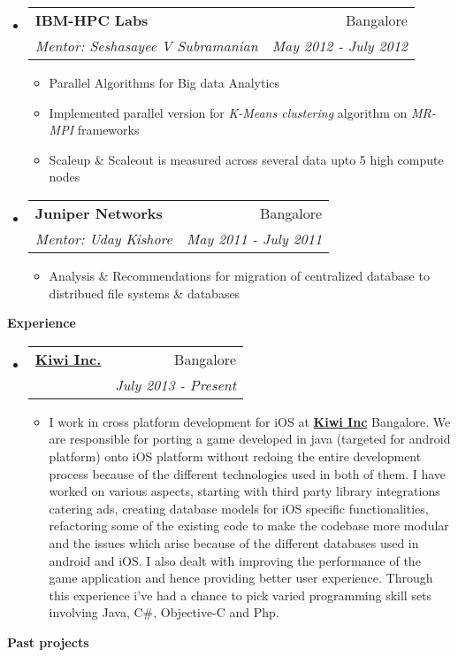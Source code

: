 \documentclass[letterpaper,11pt]{article}
\makeatletter
\newcommand{\resitem}[1]{\item #1 \vspace{-2pt}}
\newcommand{\resheading}[1]{{\large \colorbox{mygrey}{\begin{minipage}{\textwidth}{\textbf{#1 \vphantom{p\^{E}}}}\end{minipage}}}}
\newcommand{\ressubheading}[4]{
\begin{tabular*}{6.5in}{l@{\extracolsep{\fill}}r}
		\textbf{#1} & #2 \\
		\textit{#3} & \textit{#4} \\
\end{tabular*}\vspace{-6pt}}
\makeatother
\begin{document}
\begin{itemize}
		\item
			\ressubheading{{IBM-HPC Labs}}{Bangalore}{Mentor: Seshasayee V Subramanian}{May 2012 - July 2012}
				{\footnotesize
				\begin{itemize}
					\resitem{Parallel Algorithms for Big data Analytics}
					\resitem{Implemented parallel version for \emph{K-Means clustering} algorithm on \emph{MR-MPI} frameworks}
					\resitem{Scaleup \& Scaleout is measured across several data upto 5 high compute nodes}
				\end{itemize}
				}
		\item 
			\ressubheading{{Juniper Networks}}{Bangalore}{Mentor: Uday Kishore}{May 2011 - July 2011}
				{ \footnotesize
				\begin{itemize}
					\resitem{Analysis \& Recommendations for migration of centralized database to distribued file systems \& databases}
				\end{itemize}
				}

\end{itemize}
\resheading{Experience}
\begin{itemize}
	\item
		\ressubheading{{\href{http:http://www.kiwiup.com/}{Kiwi Inc.}}}{Bangalore}{}{July 2013 - Present}
		{\footnotesize
			\begin{itemize}
				\resitem I work in cross platform development for iOS at \textbf{\href{http:http://www.kiwiup.com/}{Kiwi Inc}} Bangalore. We are responsible for porting a game developed in java (targeted for android platform) onto iOS platform without redoing the entire development process because of the different technologies used in both of them. I have worked on various aspects, starting with third party library integrations catering ads, creating database models for iOS specific functionalities, refactoring some of the existing code to make the codebase more modular and the issues which arise because of the different databases used in android and iOS. I also dealt with improving the performance of the game application and hence providing better user experience. Through this experience i've had a chance to pick varied programming skill sets involving Java, C\#, Objective-C and Php.
			\end{itemize}
		}
\end{itemize}
\resheading{Past projects}
\end{document}
